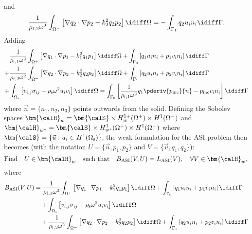 and
\begin{equation}\label{Eq2:FSIeq3}
	\frac{1}{\rho_{\mathrm{f},2} \omega^2}\int_{\Omega^-} \left[\nabla q_2\cdot\nabla p_2 -  k_2^2 q_2p_2\right]\idiff\Omega = -\int_{\Gamma_1} q_2 u_i n_i\idiff\Gamma.
\end{equation}
Adding 
\begin{align*} %
\begin{split}
	&\frac{1}{\rho_{\mathrm{f},1} \omega^2}\int_{\Omega^+} \left[\nabla q_1\cdot\nabla p_1 -  k_1^2 q_1p_1\right]\idiff\Omega + \int_{\Gamma_0}\left[q_1 u_i n_i + p_1 v_i n_i\right]\idiff\Gamma\\
	+&\frac{1}{\rho_{\mathrm{f},2} \omega^2}\int_{\Omega^-} \left[\nabla q_2\cdot\nabla p_2 -  k_2^2 q_2p_2\right]\idiff\Omega +\int_{\Gamma_1}\left[q_2 u_i n_i + p_2 v_i n_i\right]\idiff\Gamma\\
	 +& \int_{\Omega_{\mathrm{s}}} \left[v_{i,j}\sigma_{ij} - \rho_{\mathrm{s}}\omega^2 u_i v_i\right]\idiff\Omega = \int_{\Gamma_0} \left[\frac{1}{\rho_{\mathrm{f},1} \omega^2}q_1\pderiv{p_{\mathrm{inc}}}{n} - p_{\mathrm{inc}} v_i n_i\right]\idiff\Gamma
\end{split}
\end{align*}
where $\vec{n}=\{n_1,n_2,n_3\}$ points outwards from the solid. Defining the Sobolev spaces $\bm{\calH}_w = \bm{\calS}\times H_w^{1+}(\Omega^+) \times H^1(\Omega^-)$ and $\bm{\calH}_{w^*} = \bm{\calS}\times H_{w^*}^1(\Omega^+) \times H^1(\Omega^-)$ where $\bm{\calS} = \{\vec{u}: u_i\in H^1(\Omega_{\mathrm{s}})\}$, the weak formulation for the ASI problem then becomes (with the notation $U=\{\vec{u},p_1,p_2\}$ and $V = \{\vec{v},q_1,q_2\}$): 
\begin{equation}
	\text{Find}\quad U\in\bm{\calH}_w\quad \text{such that} \quad B_{\mathrm{ASI}}(V,U) = L_{\mathrm{ASI}}(V),\quad \forall V\in\bm{\calH}_{w^*}
\end{equation}
where
\begin{align*}
	B_{\mathrm{ASI}}(V,U) &= \frac{1}{\rho_{\mathrm{f},1} \omega^2}\int_{\Omega^+} \left[\nabla q_1\cdot\nabla p_1 -  k_1^2 q_1p_1\right]\idiff\Omega + \int_{\Gamma_0}\left[q_1 u_i n_i + p_1 v_i n_i\right]\idiff\Gamma\\
	&{\hskip1em\relax}+\int_{\Omega_{\mathrm{s}}} \left[v_{i,j}\sigma_{ij} - \rho_{\mathrm{s}}\omega^2 u_i v_i\right]\idiff\Omega \\
	&{\hskip1em\relax}+\frac{1}{\rho_{\mathrm{f},2} \omega^2}\int_{\Omega^-} \left[\nabla q_2\cdot\nabla p_2 -  k_2^2 q_2p_2\right]\idiff\Omega +\int_{\Gamma_1}\left[q_2 u_i n_i + p_2 v_i n_i\right]\idiff\Gamma
\end{align*}
